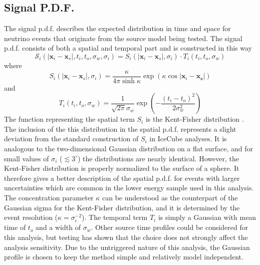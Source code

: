 \documentclass{gatech-thesis}
\begin{document}
\subsection{Signal P.D.F.}
The signal p.d.f. describes the expected distribution in time and space for neutrino events that originate from the source model being tested. The signal p.d.f. consists of both a spatial and temporal part and is constructed in this way
\begin{equation}
\mathcal{S}_i(|\mathbf{x}_i-\mathbf{x}_s|,t_i,t_o,\sigma_w,\sigma_i) = S_i(|\mathbf{x}_i-\mathbf{x}_s|,\sigma_i) \cdot T_i(t_i,t_o,\sigma_w)
\end{equation}
where
\begin{equation}
S_i(|\mathbf{x}_i-\mathbf{x}_s|,\sigma_i) = \frac{\kappa}{4\pi \sinh \kappa} \exp \left(\kappa \cos |\mathbf{x}_i-\mathbf{x_s}|\right)
\end{equation}
and
\begin{equation}
T_i(t_i,t_o,\sigma_w) = \frac{1}{\sqrt{2\pi}\sigma_w} \exp \left(-\frac{(t_i-t_o)^2}{2 \sigma_w^2}\right)
\end{equation}
The function representing the spatial term $S_i$ is the Kent-Fisher distribution \cite{1982}. The inclusion of the this distribution in the spatial p.d.f. represents a slight deviation from the standard construction of $S_i$ in IceCube analyses. It is analogous to the two-dimensional Gaussian distribution on a flat surface, and for small values of $\sigma_{i}$ ($\lesssim 3^{\circ}$) the distributions are nearly identical. However, the Kent-Fisher distribution is properly normalized to the surface of a sphere. It therefore gives a better description of the spatial p.d.f. for events with larger uncertainties which are common in the lower energy sample used in this analysis. The concentration parameter $\kappa$ can be understood as the counterpart of the Gaussian sigma for the Kent-Fisher distribution, and it is determined by the event resolution ($\kappa = \sigma_{i}^{-2}$). The temporal term $T_i$ is simply a Gaussian with mean time of $t_o$ and a width of $\sigma_w$. Other source time profiles could be considered for this analysis, but testing has shown that the choice does not strongly affect the analysis sensitivity. Due to the untriggered nature of this analysis, the Gaussian profile is chosen to keep the method simple and relatively model independent. 
	
\end{document}
